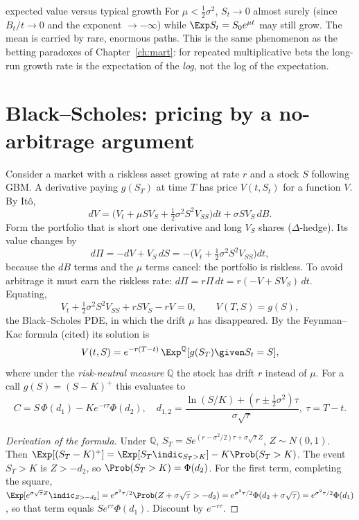 \begin{nuance}{expected value versus typical growth}
For $\mu<\tfrac12\sigma^2$, $S_t\to0$ almost surely (since $B_t/t\to0$ and the exponent
$\to-\infty$) while $\Exp S_t=S_0e^{\mu t}$ may still grow. The mean is carried by
rare, enormous paths. This is the same phenomenon as the betting paradoxes of
Chapter~\ref{ch:mart}: for repeated multiplicative bets the long-run growth rate is the expectation of
the \emph{log}, not the log of the expectation.
\end{nuance}

\section{Black--Scholes: pricing by a no-arbitrage argument}

Consider a market with a riskless asset growing at rate $r$ and a stock $S$ following
GBM. A derivative paying $g(S_T)$ at time $T$ has price $V(t,S_t)$ for a function $V$.
By It\^o,
\[
dV=\bigl(V_t+\mu SV_S+\tfrac12\sigma^2S^2V_{SS}\bigr)dt+\sigma SV_S\,dB .
\]
Form the portfolio that is short one derivative and long $V_S$ shares ($\Delta$-hedge).
Its value changes by
\[
d\Pi=-dV+V_S\,dS=-\bigl(V_t+\tfrac12\sigma^2S^2V_{SS}\bigr)dt ,
\]
because the $dB$ terms and the $\mu$ terms cancel: the portfolio is riskless. To avoid
arbitrage it must earn the riskless rate: $d\Pi=r\Pi\,dt=r(-V+SV_S)\,dt$. Equating,
\[
V_t+\tfrac12\sigma^2S^2V_{SS}+rSV_S-rV=0,\qquad V(T,S)=g(S) ,
\]
the Black--Scholes PDE, in which the drift $\mu$ has disappeared. By the Feynman--Kac formula
(cited) its solution is
\[
V(t,S)=e^{-r(T-t)}\,\Exp^{\mathbb Q}[g(S_T)\given S_t=S],
\]
where under the \emph{risk-neutral measure} $\mathbb Q$ the stock has drift $r$ instead of
$\mu$. For a call $g(S)=(S-K)^+$ this evaluates to
\[
C=S\,\Phi(d_1)-Ke^{-r\tau}\Phi(d_2),\quad d_{1,2}=\frac{\ln(S/K)+(r\pm\tfrac12\sigma^2)\tau}{\sigma\sqrt\tau},\ \tau=T-t .
\]
\begin{proof}[Derivation of the formula]
Under $\mathbb Q$, $S_T=Se^{(r-\sigma^2/2)\tau+\sigma\sqrt\tau Z}$, $Z\sim N(0,1)$. Then
$\Exp[(S_T-K)^+]=\Exp[S_T\indic_{S_T>K}]-K\Prob(S_T>K)$. The event $S_T>K$ is
$Z>-d_2$, so $\Prob(S_T>K)=\Phi(d_2)$. For the first term, completing the square,
$\Exp[e^{\sigma\sqrt\tau Z}\indic_{Z>-d_2}]=e^{\sigma^2\tau/2}\Prob(Z+\sigma\sqrt\tau>-d_2)=e^{\sigma^2\tau/2}\Phi(d_2+\sigma\sqrt\tau)=e^{\sigma^2\tau/2}\Phi(d_1)$,
so that term equals $Se^{r\tau}\Phi(d_1)$. Discount by $e^{-r\tau}$.
\end{proof}

